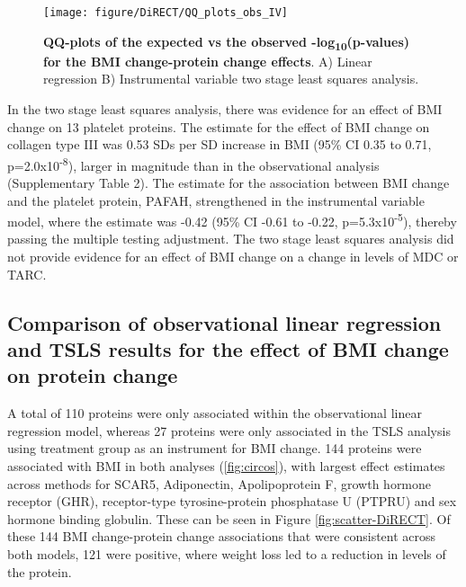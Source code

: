 \documentclass[11pt,twoside]{bristolthesis}
\begin{document}
\begin{figure}

{\centering \texttt{[image: figure/DiRECT/QQ\_plots\_obs\_IV]} 

}

\caption[QQ-plots of the expected vs the observed -log\textsubscript{10}(p-values) for the BMI change-protein change effects]{\textbf{QQ-plots of the expected vs the observed -log\textsubscript{10}(p-values) for the BMI change-protein change effects}. A) Linear regression B) Instrumental variable two stage least squares analysis.}\label{fig:qq-plot-DiRECT}
\end{figure}
In the two stage least squares analysis, there was evidence for an effect of BMI change on 13 platelet proteins. The estimate for the effect of BMI change on collagen type III was 0.53 SDs per SD increase in BMI (95\% CI 0.35 to 0.71, p=2.0x10\textsuperscript{-8}), larger in magnitude than in the observational analysis (Supplementary Table 2). The estimate for the association between BMI change and the platelet protein, PAFAH, strengthened in the instrumental variable model, where the estimate was -0.42 (95\% CI -0.61 to -0.22, p=5.3x10\textsuperscript{-5}), thereby passing the multiple testing adjustment. The two stage least squares analysis did not provide evidence for an effect of BMI change on a change in levels of MDC or TARC.

\hypertarget{comparison-of-observational-linear-regression-and-tsls-results-for-the-effect-of-bmi-change-on-protein-change}{%
\subsection{Comparison of observational linear regression and TSLS results for the effect of BMI change on protein change}\label{comparison-of-observational-linear-regression-and-tsls-results-for-the-effect-of-bmi-change-on-protein-change}}

A total of 110 proteins were only associated within the observational linear regression model, whereas 27 proteins were only associated in the TSLS analysis using treatment group as an instrument for BMI change. 144 proteins were associated with BMI in both analyses (\ref{fig:circos}), with largest effect estimates across methods for SCAR5, Adiponectin, Apolipoprotein F, growth hormone receptor (GHR), receptor-type tyrosine-protein phosphatase U (PTPRU) and sex hormone binding globulin. These can be seen in Figure \ref{fig:scatter-DiRECT}. Of these 144 BMI change-protein change associations that were consistent across both models, 121 were positive, where weight loss led to a reduction in levels of the protein.
\end{document}
